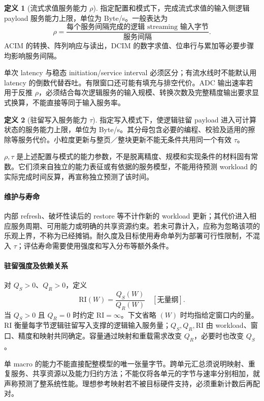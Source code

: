 \documentclass[11pt, a4paper]{ctexart}
\theoremstyle{definition}
\newtheorem{definition}{定义}[section]
\newcommand{\RI}{\mathrm{RI}}
\begin{document}
\begin{definition}[流式求值服务能力 $\rho$]
指定配置和模式下，完成流式求值的输入侧逻辑 payload 服务能力上限，单位为 Byte/s。一般表达为
\[
\rho=\frac{\text{每个服务间隔完成的逻辑 streaming 输入字节}}{\text{服务间隔}}.
\]
ACIM 的转换、阵列响应与读出，DCIM 的数字求值、位串行与累加等必要步骤均影响服务间隔。
\end{definition}
单次 latency 与稳态 initiation/service interval 必须区分；有流水线时不能默认用 latency 的倒数代替吞吐。有限窗口还可能有填充与排空代价。ADC 输出速率若用于反推 $\rho$，必须结合每次逻辑服务的输入规模、转换次数及完整精度输出要求显式换算，不能直接等同于输入服务率。

\begin{definition}[驻留写入服务能力 $\tau$]
指定写入模式下，使逻辑驻留 payload 进入可计算状态的服务能力上限，单位为 Byte/s。其分母包含必要的编程、校验及适用的擦除等服务代价。小粒度更新与整页／整块更新不能无条件共用同一个有效 $\tau$。
\end{definition}
$\rho,\tau$ 是上述配置与模式的能力参数，不是脱离精度、规模和实现条件的材料固有常数。它们须来自独立的能力表征或有依据的服务模型，不能用待预测 workload 的实际完成时间反算，再宣称独立预测了该时间。

\paragraph{维护与寿命}
内部 refresh、破坏性读后的 restore 等不计作新的 workload 更新；其代价进入相应服务周期、可用能力或明确的共享资源约束。若未可靠计入，应称为忽略该项的乐观上界，不称为已经摊销。耐久度及目标使用寿命单列为部署可行性限制，不混入 $\tau$；评估寿命需要使用强度和写入分布等额外条件。

\paragraph{驻留强度及依赖关系}
对 $Q_S>0$、$Q_R>0$，定义
\begin{equation}
\boxed{\RI(W)=\frac{Q_S(W)}{Q_R(W)}\quad[\text{无量纲}].}
\label{eq:RI}
\end{equation}
当 $Q_S>0$ 且 $Q_R=0$ 时约定 $\RI=\infty$。下文省略 $(W)$ 时均指给定窗口内的量。$\RI$ 衡量每字节逻辑驻留写入支撑的逻辑输入服务量；$Q_S,Q_R,\RI$ 由 workload、窗口、精度和映射共同确定。容量通过映射和重载需求改变 $Q_R$，必要时也改变 $Q_S$。

单 macro 的能力不能直接配整模型的唯一张量字节。跨单元汇总须说明映射、重复服务、共享资源以及能力归约方法；不能仅将各单元的字节与速率分别相加，就声称预测了整系统性能。理想参考映射若不被目标硬件支持，必须重新计数后再配对。
\end{document}
